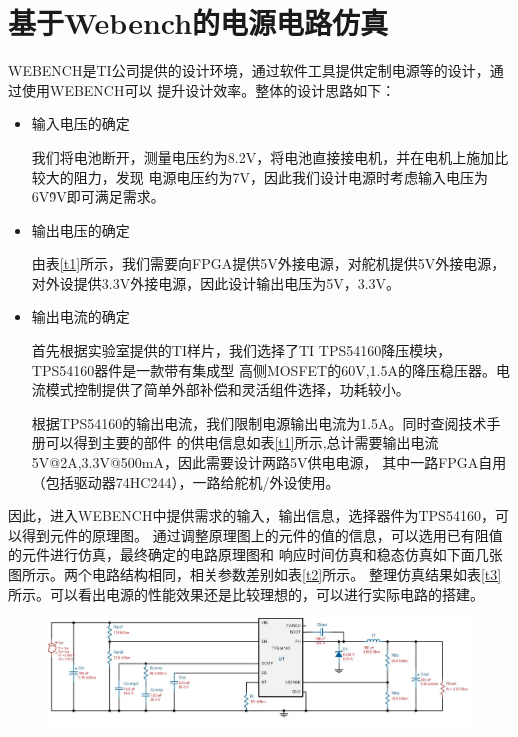\documentclass[a4paper]{paper}
\begin{document}
\section{基于Webench的电源电路仿真}
WEBENCH是TI公司提供的设计环境，通过软件工具提供定制电源等的设计，通过使用WEBENCH可以
提升设计效率。整体的设计思路如下：
\begin{itemize}
    \item 输入电压的确定

    我们将电池断开，测量电压约为8.2V，将电池直接接电机，并在电机上施加比较大的阻力，发现
    电源电压约为7V，因此我们设计电源时考虑输入电压为6V\~9V即可满足需求。

    \item 输出电压的确定

    由表\ref{t1}所示，我们需要向FPGA提供5V外接电源，对舵机提供5V外接电源，
    对外设提供3.3V外接电源，因此设计输出电压为5V，3.3V。

    \item 输出电流的确定

    首先根据实验室提供的TI样片，我们选择了TI TPS54160降压模块，TPS54160器件是一款带有集成型
    高侧MOSFET的60V,1.5A的降压稳压器。电流模式控制提供了简单外部补偿和灵活组件选择，功耗较小。

    根据TPS54160的输出电流，我们限制电源输出电流为1.5A。同时查阅技术手册可以得到主要的部件
    的供电信息如表\ref{t1}所示,总计需要输出电流5V@2A,3.3V@500mA，因此需要设计两路5V供电电源，
    其中一路FPGA自用（包括驱动器74HC244），一路给舵机/外设使用。

\end{itemize}
因此，进入WEBENCH中提供需求的输入，输出信息，选择器件为TPS54160，可以得到元件的原理图。
通过调整原理图上的元件的值的信息，可以选用已有阻值的元件进行仿真，最终确定的电路原理图和
响应时间仿真和稳态仿真如下面几张图所示。两个电路结构相同，相关参数差别如表\ref{t2}所示。
整理仿真结果如表\ref{t3}所示。可以看出电源的性能效果还是比较理想的，可以进行实际电路的搭建。
\begin{figure}
    \centering
    \includegraphics[width = \textwidth]{../../circuit/6-9to5V@1.5A.JPG}
\end{figure}
\end{document}
